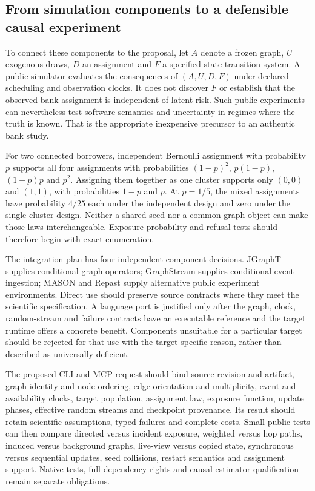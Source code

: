 \subsection{From simulation components to a defensible causal experiment}

To connect these components to the proposal, let $A$ denote a frozen graph, $U$ exogenous draws, $D$ an assignment and $F$ a specified state-transition system. A public simulator evaluates the consequences of $(A,U,D,F)$ under declared scheduling and observation clocks. It does not discover $F$ or establish that the observed bank assignment is independent of latent risk. Such public experiments can nevertheless test software semantics and uncertainty in regimes where the truth is known. That is the appropriate inexpensive precursor to an authentic bank study.\citep{exec25_jnet_choice}

For two connected borrowers, independent Bernoulli assignment with probability $p$ supports all four assignments with probabilities $(1-p)^2$, $p(1-p)$, $(1-p)p$ and $p^2$. Assigning them together as one cluster supports only $(0,0)$ and $(1,1)$, with probabilities $1-p$ and $p$. At $p=1/5$, the mixed assignments have probability $4/25$ each under the independent design and zero under the single-cluster design. Neither a shared seed nor a common graph object can make those laws interchangeable. Exposure-probability and refusal tests should therefore begin with exact enumeration.\citep{exec25_jnet_choice}

The integration plan has four independent component decisions. JGraphT supplies conditional graph operators; GraphStream supplies conditional event ingestion; MASON and Repast supply alternative public experiment environments. Direct use should preserve source contracts where they meet the scientific specification. A language port is justified only after the graph, clock, random-stream and failure contracts have an executable reference and the target runtime offers a concrete benefit. Components unsuitable for a particular target should be rejected for that use with the target-specific reason, rather than described as universally deficient.\citep{exec25_jnet_choice}

The proposed CLI and MCP request should bind source revision and artifact, graph identity and node ordering, edge orientation and multiplicity, event and availability clocks, target population, assignment law, exposure function, update phases, effective random streams and checkpoint provenance. Its result should retain scientific assumptions, typed failures and complete costs. Small public tests can then compare directed versus incident exposure, weighted versus hop paths, induced versus background graphs, live-view versus copied state, synchronous versus sequential updates, seed collisions, restart semantics and assignment support. Native tests, full dependency rights and causal estimator qualification remain separate obligations.\citep{exec25_jnet_choice}

